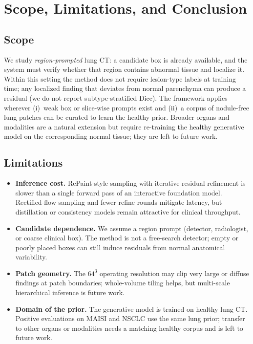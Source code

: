 \documentclass[twoside]{article}
\begin{document}
\section{Scope, Limitations, and Conclusion}
\label{sec:conclusion}

\subsection{Scope}
We study \emph{region-prompted} lung CT: a candidate box is already
available, and the system must verify whether that region contains
abnormal tissue and localize it. Within this setting the method does not require lesion-type labels at
training time; any localized finding that deviates from normal parenchyma can
produce a residual (we do not report subtype-stratified Dice).
The framework applies wherever (i)~weak box or slice-wise prompts
exist and (ii)~a corpus of nodule-free lung patches can be curated
to learn the healthy prior. Broader organs and modalities are a
natural extension but require re-training the healthy generative
model on the corresponding normal tissue; they are left to future
work.

\subsection{Limitations}
\begin{itemize}
    \item \textbf{Inference cost.} RePaint-style sampling with
    iterative residual refinement is slower than a single forward
    pass of an interactive foundation model. Rectified-flow
    sampling and fewer refine rounds mitigate latency, but
    distillation or consistency models remain attractive for
    clinical throughput.

    \item \textbf{Candidate dependence.} We assume a region prompt
    (detector, radiologist, or coarse clinical box). The method is
    not a free-search detector; empty or poorly placed boxes can
    still induce residuals from normal anatomical variability.

    \item \textbf{Patch geometry.} The $64^3$ operating resolution
    may clip very large or diffuse findings at patch boundaries;
    whole-volume tiling helps, but multi-scale hierarchical
    inference is future work.

    \item \textbf{Domain of the prior.} The generative model is
    trained on healthy lung CT. Positive evaluations on MAISI and
    NSCLC use the same lung prior; transfer to other organs or
    modalities needs a matching healthy corpus and is left to
    future work.
\end{itemize}
\end{document}
